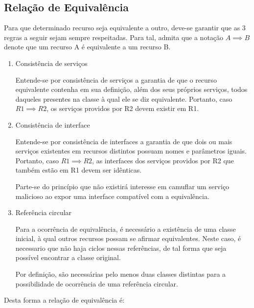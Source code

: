 \subsection{Relação de Equivalência}

Para que determinado recurso seja equivalente a outro, deve-se garantir que as 3 regras a seguir sejam sempre respeitadas. Para tal, admita que a notação $A \implies B$ denote que um recurso A é equivalente a um recurso B.

\begin{enumerate}
	\item Consistência de serviços

		Entende-se por consistência de serviços a garantia de que o recurso equivalente contenha em sua definição, além dos seus próprios serviços, todos daqueles presentes na classe à qual ele se diz equivalente. Portanto, caso $R1 \implies R2$, os serviços providos por R2 devem existir em R1.
	\item Consistência de interface

		Entende-se por consistência de interfaces a garantia de que dois ou mais serviços existentes em recursos distintos possuam nomes e parâmetros iguais. Portanto, caso $R1 \implies R2$, as interfaces dos serviços providos por R2 que também estão em R1 devem ser idênticas.

		Parte-se do princípio que não existirá interesse em camuflar um serviço malicioso ao expor uma interface compatível com a equivalência.
	\item Referência circular

		Para a ocorrência de equivalência, é necessário a existência de uma classe inicial, à qual outros recursos possam se afirmar equivalentes. Neste caso, é necessario que não haja ciclos nessas referências, de tal forma que seja possível encontrar a classe original.

		Por definição, são necessárias pelo menos duas classes distintas para a possibilidade de ocorrência de uma referência circular.
\end{enumerate}

Desta forma a relação de equivalência é:

